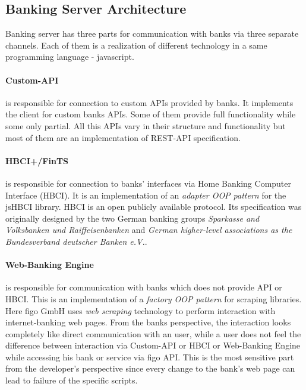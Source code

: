 \subsection{Banking Server Architecture}
\label{sec:bankingArch}
	Banking server has three parts for communication with banks via three separate channels. Each of them is a realization of different technology in a same programming language - javascript.  

	\paragraph{Custom-API} is responsible for connection to custom APIs provided by banks. It implements the client for custom banks APIs. Some of them provide full functionality while some only partial. All this APIs vary in their structure and functionality but most of them  are an implementation of REST-API specification.
	
	\paragraph{HBCI+/FinTS} is responsible for connection to banks' interfaces via Home Banking Computer Interface (HBCI). It is an implementation of an \textit{adapter OOP pattern} for the jsHBCI library.  HBCI is an open publicly available protocol. Its specification was originally designed by the two German banking groups \textit{Sparkasse and Volksbanken und Raiffeisenbanken} and \textit{German higher-level associations as the Bundesverband deutscher Banken e.V.}.  \cite{finTS}
	
	\paragraph{Web-Banking Engine} is responsible for communication with banks which does not provide API or HBCI. This is an implementation of a \textit{factory OOP pattern} for scraping libraries. Here figo GmbH uses \textit{web scraping} technology to perform interaction with internet-banking web pages.
	From the banks perspective, the interaction looks completely like direct communication with an user, while a user does not feel the difference between interaction via Custom-API or HBCI or Web-Banking Engine while accessing his bank or service via figo API.
	This is the most sensitive part from the developer's perspective since every change to the bank's web page can lead to failure of the specific scripts. \\
	

